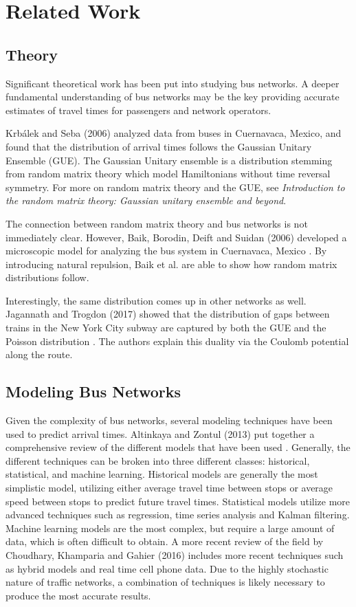 \chapter{Related Work}

\section{Theory}

Significant theoretical work has been put into studying bus networks.
A deeper fundamental understanding of bus networks may be the key providing accurate estimates of travel times for passengers and network operators.

Krb{\'a}lek and Seba (2006) analyzed data from buses in Cuernavaca, Mexico, and found that the distribution of arrival times follows the Gaussian Unitary Ensemble (GUE)\cite{krbalek2000statistical}.
The Gaussian Unitary ensemble is a distribution stemming from random matrix theory which model Hamiltonians without time reversal symmetry.
For more on random matrix theory and the GUE, see {\it Introduction to the random matrix theory: Gaussian unitary ensemble and beyond}\cite{fyodorov2005introduction}.

The connection between random matrix theory and bus networks is not immediately clear.
However, Baik, Borodin, Deift and Suidan (2006) developed a microscopic model for analyzing the bus system in Cuernavaca, Mexico \cite{baik2006model}.
By introducing natural repulsion, Baik et al. are able to show how random matrix distributions follow.

Interestingly, the same distribution comes up in other networks as well.
Jagannath and Trogdon (2017) showed that the distribution of gaps between trains in the New York City subway are captured by both the GUE and the Poisson distribution \cite{jagannath2017random}.
The authors explain this duality via the Coulomb potential along the route.

\section{Modeling Bus Networks}

Given the complexity of bus networks, several modeling techniques have been used to predict arrival times.
Altinkaya and Zontul (2013) put together a comprehensive review of the different models that have been used \cite{altinkaya2013urban}.
Generally, the different techniques can be broken into three different classes: historical, statistical, and machine learning.
Historical models are generally the most simplistic model, utilizing either average travel time between stops or average speed between stops to predict future travel times.
Statistical models utilize more advanced techniques such as regression, time series analysis and Kalman filtering.
Machine learning models are the most complex, but require a large amount of data, which is often difficult to obtain.
A more recent review of the field by Choudhary, Khamparia and Gahier (2016) includes more recent techniques such as hybrid models and real time cell phone data\cite{choudhary2016real}.
Due to the highly stochastic nature of traffic networks, a combination of techniques is likely necessary to produce the most accurate results.

